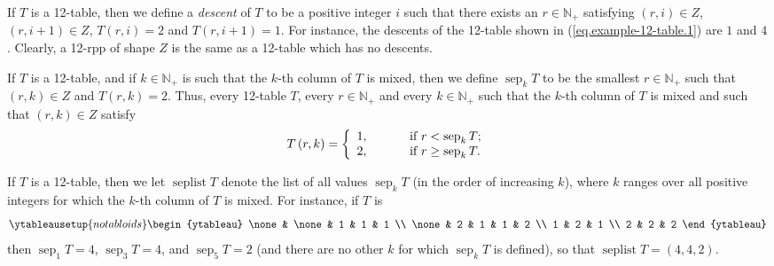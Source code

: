 \documentclass[numbers=enddot,12pt,final,onecolumn,notitlepage]{scrartcl}%
\theoremstyle{definition}
\begin{document}
If $T$ is a 12-table, then we define a \textit{descent} of $T$ to be a
positive integer $i$ such that there exists an $r\in\mathbb{N}_{+}$ satisfying
$\left(  r,i\right)  \in Z$, $\left(  r,i+1\right)  \in Z$, $T\left(
r,i\right)  =2$ and $T\left(  r,i+1\right)  =1$. For instance,
the descents of the 12-table shown in (\ref{eq.example-12-table.1})
are $1$ and $4$. Clearly, a 12-rpp of shape $Z$ is the same as a 12-table which has no
descents.

If $T$ is a 12-table, and if $k\in\mathbb{N}_{+}$ is such that the $k$-th
column of $T$ is mixed, then we define $\operatorname*{sep}\nolimits_{k}T$ to
be the smallest $r\in\mathbb{N}_{+}$ such that $\left(  r,k\right)  \in Z$ and
$T\left(  r,k\right)  =2$. Thus, every 12-table $T$, every
$r\in\mathbb{N}_{+}$ and every $k\in\mathbb{N}_{+}$ such that the $k$-th
column of $T$ is mixed and such that $\left(  r,k\right)  \in Z$ satisfy%
\begin{equation}
T\left(  r,k\right)  =\left\{
\begin{array}
[c]{l}%
1,\ \ \ \ \ \ \ \ \ \ \text{if }r<\operatorname*{sep}\nolimits_{k}T;\\
2,\ \ \ \ \ \ \ \ \ \ \text{if }r\geq\operatorname*{sep}\nolimits_{k}T.
\end{array}
\right.  \label{pf.lem.BK.Tsep}%
\end{equation}

If $T$ is a 12-table, then we let $\operatorname*{seplist}T$ denote the list
of all values $\operatorname*{sep}\nolimits_{k}T$ (in the order of increasing
$k$), where $k$ ranges over all positive integers for which the $k$-th column
of $T$ is mixed. For instance, if $T$ is
\[
%
\ytableausetup{notabloids}
\begin{ytableau}
\none& \none& 1 & 1 & 1 \\
\none& 2 & 1 & 1 & 2 \\
1 & 2 & 1 \\
2 & 2 & 2
\end{ytableau}%
\]
then $\operatorname*{sep}\nolimits_{1}T=4$, $\operatorname*{sep}\nolimits_{3}T=4$, and
$\operatorname*{sep}\nolimits_{5}T=2$ (and there are no other $k$ for which $\operatorname*{sep}\nolimits_{k}T$ is defined), so that $\operatorname*{seplist}T=\left(  4,4,2\right)  $.
\end{document}
